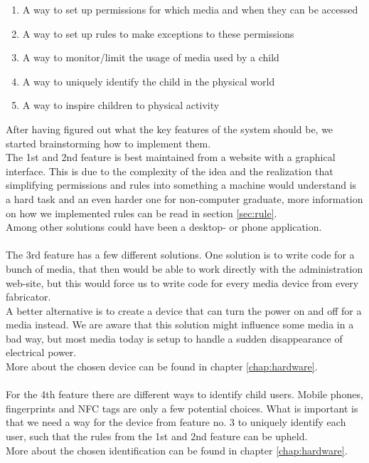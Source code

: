 \begin{enumerate}
	\item A way to set up permissions for which media and when they can be accessed
	\item A way to set up rules to make exceptions to these permissions
	\item A way to monitor/limit the usage of media used by a child
	\item A way to uniquely identify the child in the physical world
	\item A way to inspire children to physical activity
\end{enumerate}

After having figured out what the key features of the system should be, we started brainstorming how to implement them.\\
The 1st and 2nd feature is best maintained from a website with a graphical interface. This is due to the complexity of the idea and the realization that simplifying permissions and rules into something a machine would understand is a hard task and an even harder one for non-computer graduate, more information on how we implemented rules can be read in section \vref{sec:rule}.\\
Among other solutions could have been a desktop- or phone application.\\
\\
The 3rd feature has a few different solutions. One solution is to write code for a bunch of media, that then would be able to work directly with the administration web-site, but this would force us to write code for every media device from every fabricator.\\
A better alternative is to create a device that can turn the power on and off for a media instead. We are aware that this solution might influence some media in a bad way, but most media today is setup to handle a sudden disappearance of electrical power.\\
More about the chosen device can be found in chapter \vref{chap:hardware}.\\
\\
For the 4th feature there are different ways to identify child users. Mobile phones, fingerprints and NFC tags are only a few potential choices. What is important is that we need a way for the device from feature no. 3 to uniquely identify each user, such that the rules from the 1st and 2nd feature can be upheld.\\
More about the chosen identification can be found in chapter \vref{chap:hardware}.\\
